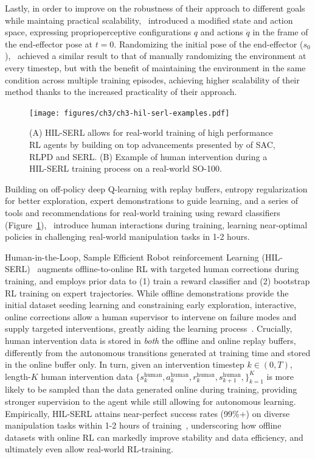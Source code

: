 Lastly, in order to improve on the robustness of their approach to different goals while maintaing practical scalability,~\citet{luoSERLSoftwareSuite2025} introduced a modified state and action space, expressing proprioperceptive configurations \( q \)  and actions \( \dot q \) in the frame of the end-effector pose at \( t=0 \).
Randomizing the initial pose of the end-effector (\( s_0 \)),~\citet{luoSERLSoftwareSuite2025} achieved a similar result to that of manually randomizing the environment at every timestep, but with the benefit of maintaining the environment in the same condition across multiple training episodes, achieving higher scalability of their method thanks to the increased practicality of their approach.

\begin{figure}
    \centering
    \texttt{[image: figures/ch3/ch3-hil-serl-examples.pdf]}
    \caption{(A) HIL-SERL allows for real-world training of high performance RL agents by building on top advancements presented by of SAC, RLPD and SERL. (B) Example of human intervention during a HIL-SERL training process on a real-world SO-100.}
    \label{fig:hil-serl-blocks}
\end{figure}

Building on off-policy deep Q-learning with replay buffers, entropy regularization for better exploration, expert demonstrations to guide learning, and a series of tools and recommendations for real-world training using reward classifiers (Figure~\ref{fig:hil-serl-blocks}),~\citet{luoPreciseDexterousRobotic2024} introduce human interactions during training, learning near-optimal policies in challenging real-world manipulation tasks in 1-2 hours.

Human-in-the-Loop, Sample Efficient Robot reinforcement Learning (HIL-SERL)~\citep{luoPreciseDexterousRobotic2024} augments offline-to-online RL with targeted human corrections during training, and employs prior data to (1) train a reward classifier and (2) bootstrap RL training on expert trajectories.
While offline demonstrations provide the initial dataset seeding learning and constraining early exploration, interactive, online corrections allow a human supervisor to intervene on failure modes and supply targeted interventions, greatly aiding the learning process~\citep{luoPreciseDexterousRobotic2024}.
Crucially, human intervention data is stored in \emph{both} the offline and online replay buffers, differently from the autonomous transitions generated at training time and stored in the online buffer only.
In turn, given an intervention timestep \( k \in (0, T) \), length-\(K\) human intervention data \( \{ s^{\text{human}}_k, a^{\text{human}}_k, r^{\text{human}}_k, s^{\text{human}}_{k+1},\}_{k=1}^K \) is more likely to be sampled than the data generated online during training, providing stronger supervision to the agent while still allowing for autonomous learning.
Empirically, HIL-SERL attains near-perfect success rates (99\%+) on diverse manipulation tasks within 1-2 hours of training~\citep{luoPreciseDexterousRobotic2024}, underscoring how offline datasets with online RL can markedly improve stability and data efficiency, and ultimately even allow real-world RL-training.

